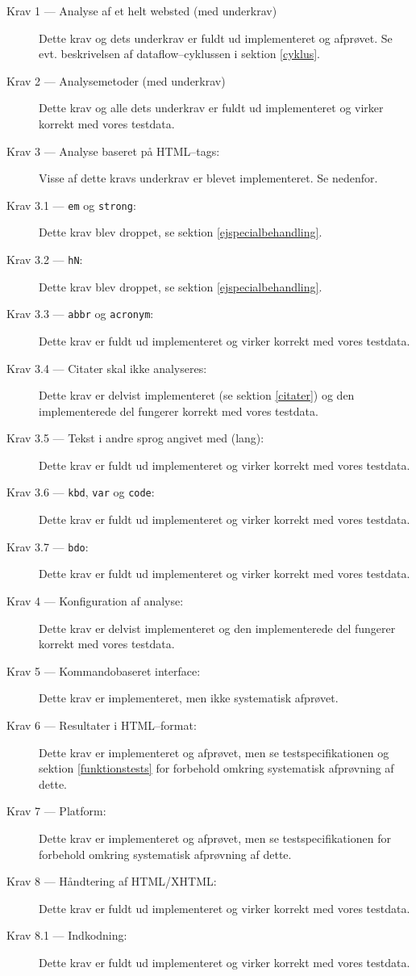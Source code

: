 \documentclass[a4paper,oneside]{memoir}
\begin{document}
\begin{description}
\item[Krav 1 --- Analyse af et helt websted (med underkrav)] Dette
  krav og dets underkrav er fuldt ud implementeret og afprøvet. Se
  evt. beskrivelsen af dataflow--cyklussen i sektion \ref{cyklus}.
\item[Krav 2 --- Analysemetoder (med underkrav)] Dette krav og alle
  dets underkrav er fuldt ud implementeret og virker korrekt med vores
  testdata.
\item[Krav 3 --- Analyse baseret på HTML--tags:] Visse af dette kravs
  underkrav er blevet implementeret. Se nedenfor.
\item[Krav 3.1 --- \texttt{em} og \texttt{strong}:] Dette krav blev
  droppet, se sektion \ref{ejspecialbehandling}.
\item[Krav 3.2 --- \texttt{hN}:] Dette krav blev droppet, se sektion
  \ref{ejspecialbehandling}.
\item[Krav 3.3 --- \texttt{abbr} og \texttt{acronym}:] Dette krav er
  fuldt ud implementeret og virker korrekt med vores testdata.
\item[Krav 3.4 --- Citater skal ikke analyseres:] Dette krav er
  delvist implementeret (se sektion \ref{citater}) og den
  implementerede del fungerer korrekt med vores testdata.
\item[Krav 3.5 --- Tekst i andre sprog angivet med (lang):] Dette krav er
  fuldt ud implementeret og virker korrekt med vores testdata.
\item[Krav 3.6 --- \texttt{kbd}, \texttt{var} og \texttt{code}:] Dette
  krav er fuldt ud implementeret og virker korrekt med vores testdata.
\item[Krav 3.7 --- \texttt{bdo}:] Dette
  krav er fuldt ud implementeret og virker korrekt med vores testdata.
\item[Krav 4 --- Konfiguration af analyse:] Dette krav er delvist
  implementeret og den implementerede del fungerer korrekt med vores
  testdata.
\item[Krav 5 --- Kommandobaseret interface:] Dette krav er
  implementeret, men ikke systematisk afprøvet.
\item[Krav 6 --- Resultater i HTML--format:] Dette krav er
  implementeret og afprøvet, men se testspecifikationen og sektion
  \ref{funktionstests} for forbehold omkring systematisk afprøvning af
  dette.
\item[Krav 7 --- Platform:] Dette krav er implementeret og afprøvet,
  men se testspecifikationen for forbehold omkring systematisk
  afprøvning af dette.
\item[Krav 8 --- Håndtering af HTML/XHTML:] Dette krav er fuldt ud
  implementeret og virker korrekt med vores testdata.
\item[Krav 8.1 --- Indkodning:] Dette krav er fuldt ud implementeret
  og virker korrekt med vores testdata.
\end{description}
\end{document}
